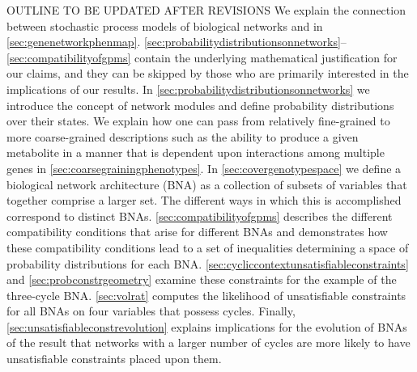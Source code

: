 {\color{red} OUTLINE TO BE UPDATED AFTER REVISIONS We explain the connection between stochastic process models of biological networks and \gnpm{} in \ref{sec:genenetworkphenmap}. \ref{sec:probabilitydistributionsonnetworks}--\ref{sec:compatibilityofgpms} contain the underlying mathematical justification for our claims, and they can be skipped by those who are primarily interested in the implications of our results. In \ref{sec:probabilitydistributionsonnetworks} we introduce the concept of network modules and define probability distributions over their states. We explain how one can pass from relatively fine-grained to more coarse-grained descriptions such as the ability to produce a given metabolite in a manner that is dependent upon interactions among multiple genes in \ref{sec:coarsegrainingphenotypes}. In \ref{sec:covergenotypespace} we define a biological network architecture (BNA) as a collection of subsets of variables that together comprise a larger set. The different ways in which this is accomplished correspond to distinct BNAs. \ref{sec:compatibilityofgpms} describes the different compatibility conditions that arise for different BNAs and demonstrates how these compatibility conditions lead to a set of inequalities determining a space of probability distributions for each BNA. \ref{sec:cycliccontextunsatisfiableconstraints} and \ref{sec:probconstrgeometry} examine these constraints for the example of the three-cycle BNA. \ref{sec:volrat} computes the likelihood of unsatisfiable constraints for all BNAs on four variables that possess cycles. Finally, \ref{sec:unsatisfiableconstrevolution} explains implications for the evolution of BNAs of the result that networks with a larger number of cycles are more likely to have unsatisfiable constraints placed upon them.}


